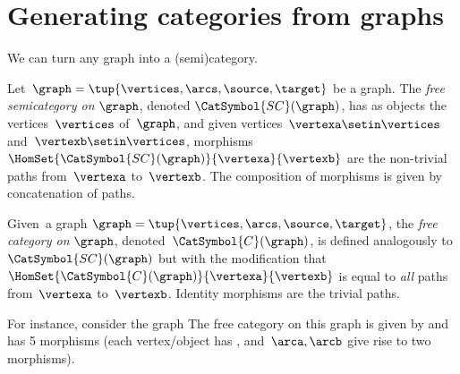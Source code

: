 
\section[Categories from graphs]{Generating categories from graphs}
\label{sec:catsfromgraphs}

We can turn any graph into a (semi)category.

\begin{ctdefinition}
    \label{def:free-semicategory}

    Let~$\graph=\tup{\vertices,\arcs,\source,\target}$ be a graph.
    The \emph{free semicategory on} $\graph$, denoted $\CatSymbol{SC}(\graph)$, has as objects the vertices~$\vertices$ of~$\graph$, and given vertices~$\vertexa\setin \vertices$ and~$\vertexb\setin \vertices$, morphisms~$\HomSet{\CatSymbol{SC}(\graph)}{\vertexa}{\vertexb}$ are the non-trivial paths from~$\vertexa$ to~$\vertexb$.
    The composition of morphisms is given by concatenation of paths.
\end{ctdefinition}

\begin{ctdefinition}
    \label{def:free-category}
    Given~a graph $\graph=\tup{\vertices,\arcs,\source,\target}$, the \emph{free category on} $\graph$, denoted~$\CatSymbol{C}(\graph)$, is defined analogously to $\CatSymbol{SC}(\graph)$ but with the modification that $\HomSet{\CatSymbol{C}(\graph)}{\vertexa}{\vertexb}$ is equal to \emph{all} paths from~$\vertexa$ to~$\vertexb$.
    Identity morphisms are the trivial paths.
\end{ctdefinition}

For instance, consider the graph
%
%
The free category on this graph is given by
%
%
and has 5 morphisms (each vertex/object has , and~$\arca,\arcb$ give rise to two morphisms).

